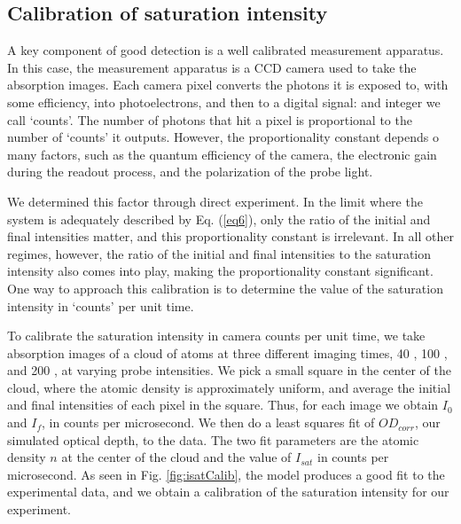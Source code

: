 \documentclass[12pt]{iopart}
\begin{document}
\subsection{Calibration of saturation intensity}
A key component of good detection is a well calibrated measurement apparatus. In this case, the measurement apparatus is a CCD camera used to take the absorption images.  Each camera pixel  converts the photons it is exposed to, with some efficiency, into photoelectrons, and then to a digital signal: and integer we  call  `counts'. The number of photons that hit a pixel is proportional to the number of `counts' it outputs. However, the proportionality constant depends o many factors, such as the quantum efficiency of the camera, the electronic gain during the readout process, and the polarization of the probe light. 
\par We determined this factor through direct experiment. In the limit where the system is adequately described by Eq. (\ref{eq6}), only the ratio of the initial and final intensities matter, and this proportionality constant is irrelevant. In all other regimes, however, the ratio of the initial and final intensities to the saturation intensity also comes into play, making the proportionality constant significant. One way to approach this calibration is to determine the value of the saturation intensity in `counts' per unit time. 
\par To calibrate the saturation intensity in camera counts per unit time, we take absorption images of a cloud of \K{} atoms at three different imaging times, 40 \us{}, 100 \us{}, and 200 \us{}, at varying probe intensities. We pick a small square in the center of the cloud, where the atomic density is approximately uniform, and average the initial and final intensities of each pixel in the square. Thus, for each image we obtain $I_0$ and $I_f$, in counts per microsecond. We then do a least squares fit of $OD_{corr}$, our simulated optical depth, to the data. The two fit parameters are the atomic density $n$ at the center of the cloud and the value of $I_{sat}$ in counts per microsecond. As seen in Fig. \ref{fig:isatCalib}, the model produces a good fit to the experimental data, and we obtain a calibration of the saturation intensity for our experiment. 
\end{document}
